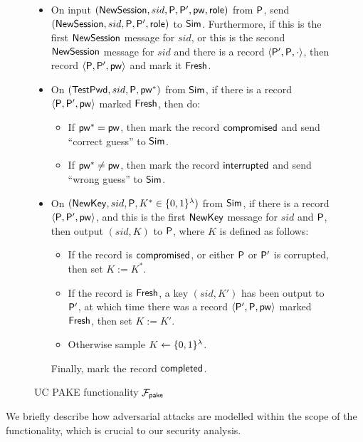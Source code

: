	\begin{figure}[tbp]
		\begin{framed}\small
			\begin{itemize}
				\item On input $(\mathsf{NewSession}, sid, \mathsf{P}, \mathsf{P}', \mathsf{pw}, \mathsf{role})$ from $\mathsf{P}$, send $(\mathsf{NewSession},\allowbreak sid,\allowbreak \mathsf{P},\allowbreak \mathsf{P}',\allowbreak \mathsf{role})$ to $\mathsf{Sim}$. Furthermore, if this is the first $\mathsf{NewSession}$ message for $sid$, or this is the second $\mathsf{NewSession}$ message for $sid$ and there is a record $\left<\mathsf{P}', \mathsf{P}, \cdot\right>$, then record $\left<\mathsf{P}, \mathsf{P}', \mathsf{pw}\right>$ and mark it $\mathsf{Fresh}$.
				\item On $(\mathsf{TestPwd}, sid, \mathsf{P}, \mathsf{pw}^*)$ from $\mathsf{Sim}$, if there is a record $\left<\mathsf{P}, \mathsf{P}', \mathsf{pw}\right>$ marked $\mathsf{Fresh}$, then do:
				\begin{itemize}
					\item If $\mathsf{pw}^* = \mathsf{pw}$, then mark the record $\mathsf{compromised}$ and send ``correct guess'' to $\mathsf{Sim}$.
					\item If $\mathsf{pw}^* \neq \mathsf{pw}$, then mark the record $\mathsf{interrupted}$ and send ``wrong guess'' to $\mathsf{Sim}$.
				\end{itemize}
				\item On $(\mathsf{NewKey}, sid, \mathsf{P}, K^* \in \{0,1\}^\lambda)$ from $\mathsf{Sim}$, if there is a record $\left<\mathsf{P}, \mathsf{P}', \mathsf{pw}\right>$, and this is the first $\mathsf{NewKey}$ message for $sid$ and $\mathsf{P}$, then output $(sid, K)$ to $\mathsf{P}$, where $K$ is defined as follows:
				\begin{itemize}
					\item If the record is $\mathsf{compromised}$, or either $\mathsf{P}$ or $\mathsf{P}'$ is corrupted, then set $K := K^*$.
					\item If the record is $\mathsf{Fresh}$, a key $(sid, K')$ has been output to $\mathsf{P}'$, at which time there was a record $\left<\mathsf{P}', \mathsf{P}, \mathsf{pw}\right>$ marked $\mathsf{Fresh}$, then set $K := K'$.
					\item Otherwise sample $K \gets \{0,1\}^\lambda$.
				\end{itemize}
				Finally, mark the record $\mathsf{completed}$.
			\end{itemize}
		\end{framed}
		\caption{UC PAKE functionality $\mathcal{F}_{\mathsf{pake}}$}
		\label{fig:pake-functionality}
	\end{figure}
	
	We briefly describe how adversarial attacks are modelled within the scope of the functionality, which is crucial to our security analysis.
	

